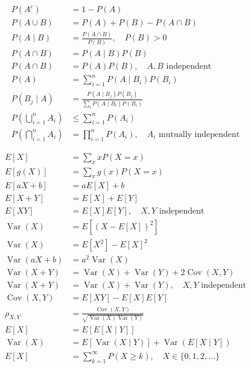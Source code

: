 \begin{align*}
P(A^c)&=1-P(A)\\
P(A\cup B)&=P(A)+P(B)-P(A\cap B)\\
P(A\mid B)&=\frac{P(A\cap B)}{P(B)},\quad P(B)>0\\
P(A\cap B)&=P(A\mid B)P(B)\\
P(A\cap B)&=P(A)P(B),\quad A,B\text{ independent}\\
P(A)&=\sum_{i=1}^{n}P(A\mid B_i)P(B_i)\\
P(B_j\mid A)
&=\frac{P(A\mid B_j)P(B_j)}
{\sum_iP(A\mid B_i)P(B_i)}\\
P\left(\bigcup_{i=1}^{n}A_i\right)
&\le\sum_{i=1}^{n}P(A_i)\\
P\left(\bigcap_{i=1}^{n}A_i\right)
&=\prod_{i=1}^{n}P(A_i),
\quad A_i\text{ mutually independent}
\end{align*}

\begin{align*}
E[X]&=\sum_x xP(X=x)\\
E[g(X)]&=\sum_x g(x)P(X=x)\\
E[aX+b]&=aE[X]+b\\
E[X+Y]&=E[X]+E[Y]\\
E[XY]&=E[X]E[Y],\quad X,Y\text{ independent}\\
\operatorname{Var}(X)
&=E[(X-E[X])^2]\\
\operatorname{Var}(X)
&=E[X^2]-E[X]^2\\
\operatorname{Var}(aX+b)
&=a^2\operatorname{Var}(X)\\
\operatorname{Var}(X+Y)
&=\operatorname{Var}(X)+\operatorname{Var}(Y)
+2\operatorname{Cov}(X,Y)\\
\operatorname{Var}(X+Y)
&=\operatorname{Var}(X)+\operatorname{Var}(Y),
\quad X,Y\text{ independent}\\
\operatorname{Cov}(X,Y)
&=E[XY]-E[X]E[Y]\\
\rho_{X,Y}
&=\frac{\operatorname{Cov}(X,Y)}
{\sqrt{\operatorname{Var}(X)\operatorname{Var}(Y)}}\\
E[X]&=E[E[X\mid Y]]\\
\operatorname{Var}(X)
&=E[\operatorname{Var}(X\mid Y)]
+\operatorname{Var}(E[X\mid Y])\\
E[X]&=\sum_{k=1}^{\infty}P(X\ge k),
\quad X\in\{0,1,2,\ldots\}
\end{align*}